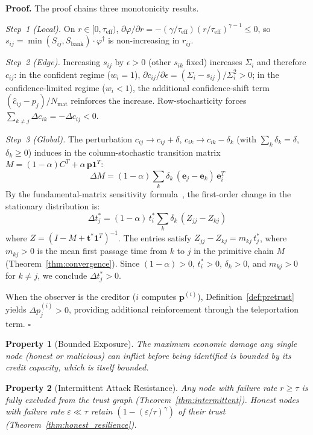 \documentclass[11pt]{article}
\newtheorem{property}{Property}[section]
\newcommand{\qed}{\hfill}
\newenvironment{proof}{\noindent\textbf{Proof.}}{\qed$\square$\par\medskip}
\begin{document}
\begin{proof}
The proof chains three monotonicity results.

\emph{Step~1 (Local).}
On $r \in [0, \tau_{\text{eff}})$, $\partial\varphi/\partial r = -(\gamma/\tau_{\text{eff}})(r/\tau_{\text{eff}})^{\gamma-1} \leq 0$, so $s_{ij} = \min(S_{ij}, S_{\text{bank}}) \cdot \varphi^{\dagger}$ is non-increasing in $r_{ij}$.

\emph{Step~2 (Edge).}
Increasing $s_{ij}$ by $\epsilon > 0$ (other $s_{ik}$ fixed) increases $\Sigma_i$ and therefore $c_{ij}$:
in the confident regime ($w_i = 1$), $\partial c_{ij}/\partial\epsilon = (\Sigma_i - s_{ij})/\Sigma_i^2 > 0$;
in the confidence-limited regime ($w_i < 1$), the additional confidence-shift term $(\hat{c}_{ij} - p_j)/N_{\text{mat}}$ reinforces the increase.
Row-stochasticity forces $\sum_{k \neq j} \Delta c_{ik} = -\Delta c_{ij} < 0$.

\emph{Step~3 (Global).}
The perturbation $c_{ij} \to c_{ij} + \delta$, $c_{ik} \to c_{ik} - \delta_k$ (with $\sum_k \delta_k = \delta$, $\delta_k \geq 0$) induces in the column-stochastic transition matrix $M = (1-\alpha)C^T + \alpha\,\mathbf{p}\mathbf{1}^T$:
\[
    \Delta M = (1-\alpha)\sum_k \delta_k\,(\mathbf{e}_j - \mathbf{e}_k)\,\mathbf{e}_i^T
\]
By the fundamental-matrix sensitivity formula~\cite{meyer1975role}, the first-order change in the stationary distribution is:
\[
    \Delta t^*_j = (1-\alpha)\,t^*_i \sum_k \delta_k\,(Z_{jj} - Z_{kj})
\]
where $Z = (I - M + \mathbf{t}^*\mathbf{1}^T)^{-1}$. The entries satisfy $Z_{jj} - Z_{kj} = m_{kj}\,t^*_j$, where $m_{kj} > 0$ is the mean first passage time from $k$ to $j$ in the primitive chain $M$ (Theorem~\ref{thm:convergence}). Since $(1-\alpha) > 0$, $t^*_i > 0$, $\delta_k > 0$, and $m_{kj} > 0$ for $k \neq j$, we conclude $\Delta t^*_j > 0$.

When the observer is the creditor ($i$ computes $\mathbf{p}^{(i)}$), Definition~\ref{def:pretrust} yields $\Delta p^{(i)}_j > 0$, providing additional reinforcement through the teleportation term. \qed
\end{proof}

\begin{property}[Bounded Exposure]
The maximum economic damage any single node (honest or malicious) can inflict before being identified is bounded by its credit capacity, which is itself bounded.
\end{property}

\begin{property}[Intermittent Attack Resistance]
Any node with failure rate $r \geq \tau$ is fully excluded from the trust graph (Theorem~\ref{thm:intermittent}). Honest nodes with failure rate $\varepsilon \ll \tau$ retain $(1 - (\varepsilon/\tau)^\gamma)$ of their trust (Theorem~\ref{thm:honest_resilience}).
\end{property}
\end{document}
